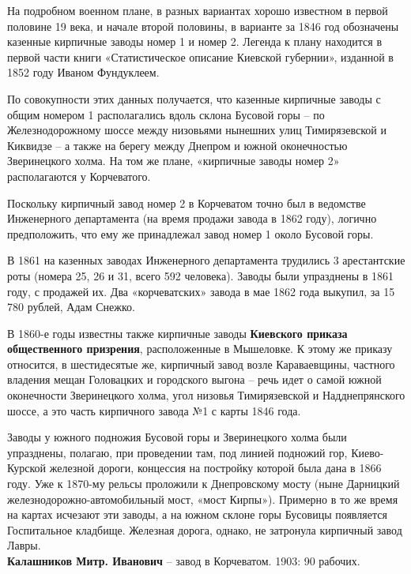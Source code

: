 На подробном военном плане, в разных вариантах хорошо известном в первой половине 19 века, и начале второй половины, в варианте за 1846 год обозначены казенные кирпичные заводы номер 1 и номер 2. Легенда к плану находится в первой части книги «Статистическое описание Киевской губернии», изданной в 1852 году Иваном Фундуклеем. 

По совокупности этих данных получается, что казенные кирпичные заводы с общим номером 1 располагались вдоль склона Бусовой горы – по Железнодорожному шоссе между низовьями нынешних улиц Тимирязевской и Киквидзе – а также на берегу между Днепром и южной оконечностью Зверинецкого холма. На том же плане, «кирпичные заводы номер 2» располагаются у Корчеватого.

Поскольку кирпичный завод номер 2 в Корчеватом точно был в ведомстве Инженерного департамента (на время продажи завода в 1862 году), логично предположить, что ему же принадлежал завод номер 1 около Бусовой горы.

В 1861 на казенных заводах Инженерного департамента трудились 3 арестантские роты (номера 25, 26 и 31, всего 592 человека). Заводы были упразднены в 1861 году, с продажей их. Два «корчеватских» завода в мае 1862 года выкупил, за 15 780 рублей, Адам Снежко.

В 1860-е годы известны также кирпичные заводы \textbf{Киевского приказа общественного призрения}, расположенные в Мышеловке. К этому же приказу относится, в шестидесятые же, кирпичный завод возле Караваевщины, частного владения мещан Головацких и городского выгона – речь идет о самой южной оконечности Зверинецкого холма, угол низовья Тимирязевской и Надднепрянского шоссе, а это часть кирпичного завода №1 с карты 1846 года.

Заводы у южного подножия Бусовой горы и Зверинецкого холма были упразднены, полагаю, при проведении там, под линией подножий гор, Киево-Курской железной дороги, концессия на постройку которой была дана в 1866 году. Уже к 1870-му рельсы проложили к Днепровскому мосту (ныне Дарницкий железнодорожно-автомобильный мост, «мост Кирпы»). Примерно в то же время на картах исчезают эти заводы, а на южном склоне горы Бусовицы появляется Госпитальное кладбище. Железная дорога, однако, не затронула кирпичный завод Лавры.\\

\noindent\textbf{Калашников Митр. Иванович} – завод в Корчеватом. 1903: 90 рабочих.\\


